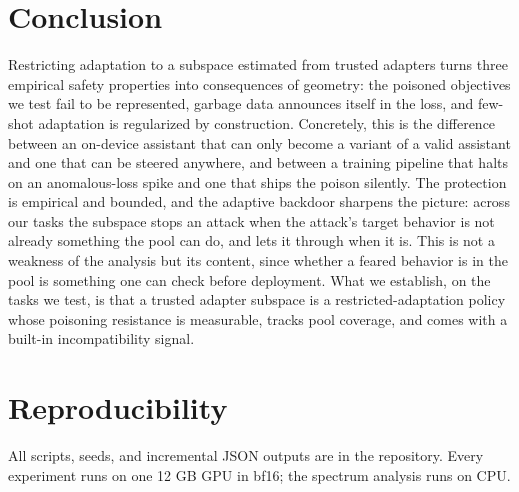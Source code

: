 \documentclass[10pt]{article}
\begin{document}
\section{Conclusion}
Restricting adaptation to a subspace estimated from trusted adapters turns three
empirical safety properties into consequences of geometry: the poisoned
objectives we test fail to be represented, garbage data announces itself in the
loss, and few-shot adaptation is regularized by construction. Concretely, this
is the difference between an on-device assistant that can only become a variant
of a valid assistant and one that can be steered anywhere, and between a
training pipeline that halts on an anomalous-loss spike and one that ships the
poison silently. The protection is empirical and bounded, and the adaptive backdoor sharpens the
picture: across our tasks the subspace stops an attack when the attack's target
behavior is not already something the pool can do, and lets it through when it
is. This is not a weakness of the analysis but its content, since whether a
feared behavior is in the pool is something one can check before deployment.
What we establish, on the tasks we test, is that a trusted adapter subspace is a
restricted-adaptation policy whose poisoning resistance is measurable, tracks
pool coverage, and comes with a built-in incompatibility signal.

\section{Reproducibility}
All scripts, seeds, and incremental JSON outputs are in the repository. Every
experiment runs on one 12 GB GPU in bf16; the spectrum analysis runs on CPU.



\end{document}
